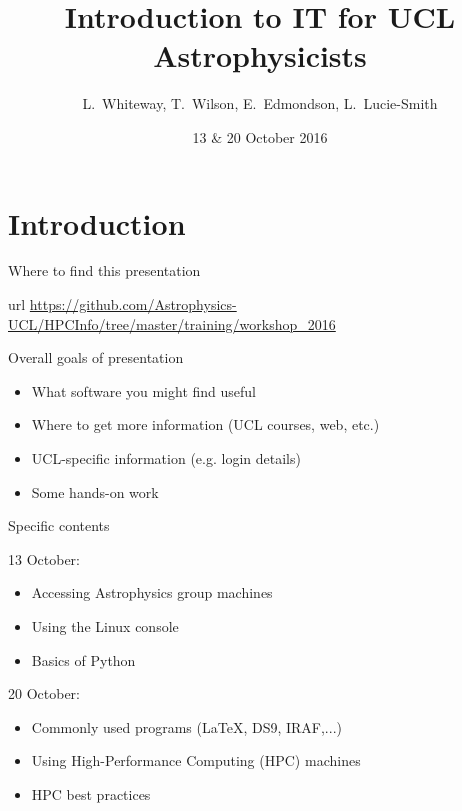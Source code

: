 \documentclass{beamer}
\title[IT Workshops] %
{Introduction to IT for UCL Astrophysicists}
\author{L.~Whiteway, T.~Wilson, E.~Edmondson, L.~Lucie-Smith}
\institute[UCL]
{
  Department of Physics and Astronomy\\
  University College London
}
\date[IT 2016]
{13 \& 20 October 2016}
\begin{document}
\frame{\titlepage}

\section{Introduction}

\begin{frame}{Where to find this presentation}
  \begin{block}{url}
    \url{https://github.com/Astrophysics-UCL/HPCInfo/tree/master/training/workshop_2016}
  \end{block}
\end{frame}


\begin{frame}{Overall goals of presentation}
  \begin{itemize}
    \item What software you might find useful
    \item Where to get more information (UCL courses, web, etc.)
    \item UCL-specific information (e.g. login details)
    \item Some hands-on work
  \end{itemize}
\end{frame}

\begin{frame}{Specific contents}

  \begin{block}{13 October:}
    \begin{itemize}
      \item Accessing Astrophysics group machines
      \item Using the Linux console
      \item Basics of Python
    \end{itemize}
  \end{block}
  
  \begin{block}{20 October:}
    \begin{itemize}
    \item Commonly used programs (LaTeX, DS9, IRAF,...)
    \item Using High-Performance Computing (HPC) machines
    \item HPC best practices
    \end{itemize}
  \end{block}

\end{frame}
\end{document}
